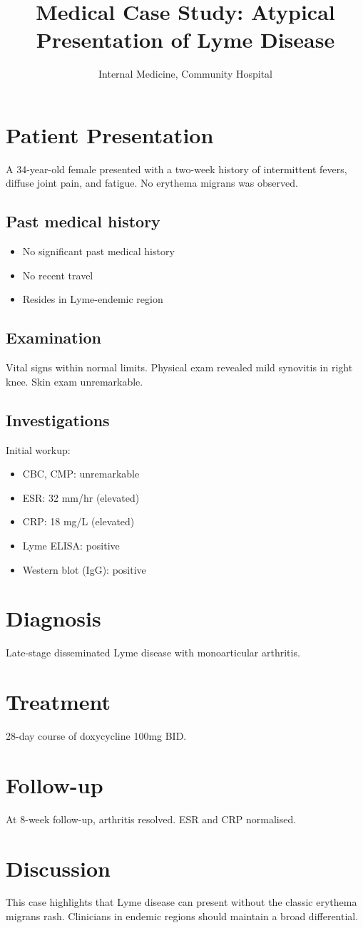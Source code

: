 \documentclass{article}
\title{Medical Case Study: Atypical Presentation of Lyme Disease}
\author{Internal Medicine, Community Hospital}
\begin{document}
\maketitle

\section*{Patient Presentation}
A 34-year-old female presented with a two-week history of intermittent fevers, diffuse joint pain, and fatigue. No erythema migrans was observed.

\subsection*{Past medical history}
\begin{itemize}[noitemsep]
  \item No significant past medical history
  \item No recent travel
  \item Resides in Lyme-endemic region
\end{itemize}

\subsection*{Examination}
Vital signs within normal limits. Physical exam revealed mild synovitis in right knee. Skin exam unremarkable.

\subsection*{Investigations}
Initial workup:
\begin{itemize}[noitemsep]
  \item CBC, CMP: unremarkable
  \item ESR: 32 mm/hr (elevated)
  \item CRP: 18 mg/L (elevated)
  \item Lyme ELISA: positive
  \item Western blot (IgG): positive
\end{itemize}

\section*{Diagnosis}
Late-stage disseminated Lyme disease with monoarticular arthritis.

\section*{Treatment}
28-day course of doxycycline 100mg BID.

\section*{Follow-up}
At 8-week follow-up, arthritis resolved. ESR and CRP normalised.

\section*{Discussion}
This case highlights that Lyme disease can present without the classic erythema migrans rash. Clinicians in endemic regions should maintain a broad differential.
\end{document}

